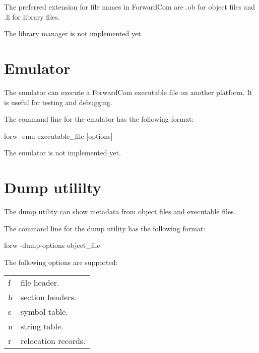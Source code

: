 \documentclass[forwardcom.tex]{subfiles}
\begin{document}
The preferred extension for file names in ForwardCom are .ob for object files and .li for library files.
\vspace{2mm}

The library manager is not implemented yet.
\vspace{2mm}


\section{Emulator} \label{emulator}

The emulator can execute a ForwardCom executable file on another platform. It is useful for testing and debugging.
\vspace{2mm}

The command line for the emulator has the following format:
\vspace{2mm}

\hspace{5mm} {\ttfamily forw -emu executable\_file [options]}
\vspace{2mm}

The emulator is not implemented yet.
\vspace{2mm}

\section{Dump utililty} \label{dumpUtililty}

The dump utility can show metadata from object files and executable files.
\vspace{2mm}

The command line for the dump utility has the following format:
\vspace{2mm}

\hspace{5mm} {\ttfamily forw -dump-options object\_file }
\vspace{2mm}

The following options are supported:\\
\begin{tabular}{|p{10mm}p{150mm}|}
\hline
f & file header.\\
h & section headers.\\
s & symbol table.\\
n & string table.\\
r & relocation records.\\
\hline
\end{tabular}
\vspace{2mm}
\end{document}
